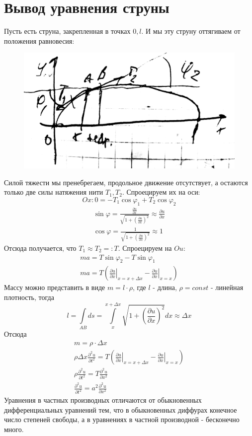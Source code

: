 \section{Вывод уравнения струны}
Пусть есть струна, закрепленная в точках $0, l$. И мы эту струну оттягиваем от положения равновесия:

\begin{figure}[H]
\includegraphics[width=\textwidth]{1}
\end{figure}

Силой тяжести мы пренебрегаем, продольное движение отсутствует, а остаются только две силы натяжения нити $T_1, T_2$. Спроецируем их на оси:
\[
		Ox: 0=-T_1 \cos \varphi_1 + T_2 \cos \varphi_2
\]
\[
	\begin{aligned}
		\sin \varphi = \frac{\frac{\partial u}{\partial x}}{\sqrt{1 + \left( \frac{\partial u}{\partial x}\right)^2}} \approx \frac{\partial u}{\partial x}\\
	\cos \varphi = \frac{1}{\sqrt{1 + \left( \frac{\partial u}{\partial x}\right)^2}} \approx 1
\end{aligned}
\]
Отсюда получается, что $T_1 \approx T_2 =: T$. Спроецируем на $Ou:$
\[
	\begin{aligned}
	ma = T \sin\varphi_2 - T \sin \varphi_1 \\
	ma = T \left(\left. \frac{\partial u}{\partial x}\right|_{x = x+\Delta x} - \left. \frac{\partial u}{\partial x}\right|_{x=x} \right)
\end{aligned}
\]
Массу можно представить в виде $m = l \cdot \rho$, где $l$ - длина, $\rho=const$ - линейная плотность, тогда
\[
	l = \int\limits_{AB} ds = \int\limits_x^{x+\Delta x} \sqrt{1 + \left( \frac{\partial u}{\partial x}\right)^2}dx \approx \Delta x
\]
Отсюда
\[
	\begin{aligned}
	m = \rho \cdot \Delta x \\
	\rho \Delta x \frac{\partial^2 u}{\partial t^2} = T \left(\left. \frac{\partial u}{\partial x}\right|_{x = x+\Delta x} - \left. \frac{\partial u}{\partial x}\right|_{x=x} \right) \\
			\rho \frac{\partial^2u}{\partial t^2} = T \frac{\partial^2 u}{\partial x^2} \\
			\frac{\partial^2 u}{\partial t^2} = a^2 \frac{\partial^2 u}{\partial x^2}
		\end{aligned}
\]
Уравнения в частных производных отличаются от обыкновенных дифференциальных уравнений тем, что в обыкновенных диффурах конечное число степеней свободы, а в уравнениях в частной производной - бесконечно много.
